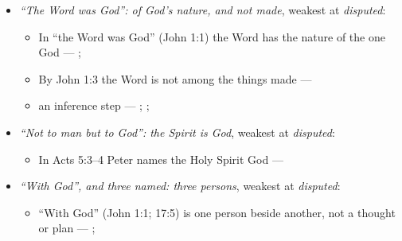 \documentclass[11pt,paper=\testimonypaper,DIV=13,parskip=false]{scrartcl}
\begin{document}
\begin{itemize}
\begin{itemize}
\item By John 1:3 the Word is not among the things made --- \cite[Tractates on John I.11]{schaff-nicene-post-nicene-fathers-1-7}
\item In Acts 5:3–4 Peter names the Holy Spirit God --- \cite[198]{calvin-commentary-acts-1844}
\item The Word of John 1:1 is God’s thought and self-expression, not a second person --- \cite[ch. 4 and 8, on John 1:1]{bernard-oneness-of-god-1983}
\item The glory of John 17:5 was the Son’s in God’s plan before the world --- \cite[ch. 8, The Preexistence of Jesus]{bernard-oneness-of-god-1983}
\item The one “name” of Matthew 28:19 is Jesus; Father, Son and Spirit are titles --- \cite[ch. 6, Matthew 28:19]{bernard-oneness-of-god-1983}
\item an inference step --- \cite[3, The Triune God]{kibbey-living-systematic-theology-2026}; \cite[ch. 4, Conclusion]{bernard-oneness-of-god-1983}; \cite[17--19]{buzzard-caveat-lector-2001}
\end{itemize}
\item \emph{“The Word was God”: of God’s nature, and not made}, weakest at \emph{disputed}:
\begin{itemize}
\item In “the Word was God” (John 1:1) the Word has the nature of the one God --- \cite{harner-qualitative-anarthrous-1973}; \cite[3, The Triune God]{kibbey-living-systematic-theology-2026}
\item By John 1:3 the Word is not among the things made --- \cite[Tractates on John I.11]{schaff-nicene-post-nicene-fathers-1-7}
\item an inference step --- \cite[3, The Triune God]{kibbey-living-systematic-theology-2026}; \cite[ch. 4, Conclusion]{bernard-oneness-of-god-1983}; \cite[17--19]{buzzard-caveat-lector-2001}
\end{itemize}
\item \emph{“Not to man but to God”: the Spirit is God}, weakest at \emph{disputed}:
\begin{itemize}
\item In Acts 5:3–4 Peter names the Holy Spirit God --- \cite[198]{calvin-commentary-acts-1844}
\end{itemize}
\item \emph{“With God”, and three named: three persons}, weakest at \emph{disputed}:
\begin{itemize}
\item “With God” (John 1:1; 17:5) is one person beside another, not a thought or plan --- \cite[3, The Triune God]{kibbey-living-systematic-theology-2026}; \cite[27]{watchtower-should-you-believe-trinity-1989}

\end{itemize}
\end{itemize}
\end{document}

